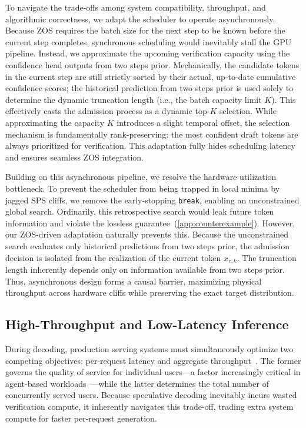 To navigate the trade-offs among system compatibility, throughput, and algorithmic correctness, we adapt the scheduler to operate asynchronously. Because ZOS requires the batch size for the next step to be known before the current step completes, synchronous scheduling would inevitably stall the GPU pipeline. Instead, we approximate the upcoming verification capacity using the confidence head outputs from two steps prior. Mechanically, the candidate tokens in the current step are still strictly sorted by their actual, up-to-date cumulative confidence scores; the historical prediction from two steps prior is used solely to determine the dynamic truncation length (i.e., the batch capacity limit $K$). This effectively casts the admission process as a dynamic top-$K$ selection. While approximating the capacity $K$ introduces a slight temporal offset, the selection mechanism is fundamentally rank-preserving: the most confident draft tokens are always prioritized for verification. This adaptation fully hides scheduling latency and ensures seamless ZOS integration.

Building on this asynchronous pipeline, we resolve the hardware utilization bottleneck. To prevent the scheduler from being trapped in local minima by jagged $\text{SPS}$ cliffs, we remove the early-stopping \texttt{break}, enabling an unconstrained global search. Ordinarily, this retrospective search would leak future token information and violate the lossless guarantee~(\autoref{app:counterexample}). However, our ZOS-driven adaptation naturally prevents this. Because the unconstrained search evaluates only historical predictions from two steps prior, the admission decision is isolated from the realization of the current token $x_{r,k}$. The truncation length inherently depends only on information available from two steps prior. Thus, asynchronous design forms a causal barrier, maximizing physical throughput across hardware cliffs while preserving the exact target distribution.

\subsection{High-Throughput and Low-Latency Inference} 
\label{sec:prod_systems}

During decoding, production serving systems must simultaneously optimize two competing objectives: per-request latency and aggregate throughput~\citep{kwon2023efficient,zhong2024distserve,zhao2025insights}. The former governs the quality of service for individual users---a factor increasingly critical in agent-based workloads~\citep{tiwari2026cachewise}---while the latter determines the total number of concurrently served users. Because speculative decoding inevitably incurs wasted verification compute, it inherently navigates this trade-off, trading extra system compute for faster per-request generation. 

